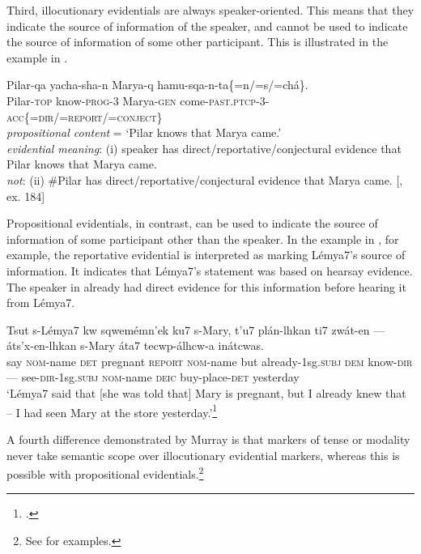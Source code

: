 Third, illocutionary evidentials are always speaker-oriented. This means that they indicate the source of information of the speaker, and cannot be used to indicate the source of information of some other participant. This is illustrated in the  example in .


\ea \label{ex:17.13}
\gll Pilar-qa  yacha-sha-n  Marya-q  hamu-sqa-n-ta\{=n/=s/=chá\}.\\
Pilar-\textsc{top}  know-\textsc{prog}-3  Marya-\textsc{gen}  come-\textsc{past.ptcp}-3-\textsc{acc\{=dir}/=\textsc{report}/=\textsc{conject\}}\\
\glt \textit{propositional content} = ‘Pilar knows that Marya came.’\\
\textit{evidential meaning}: (i) speaker has direct/reportative/conjectural evidence that Pilar knows that Marya came.\\
\textit{not}: (ii) \#Pilar has direct/reportative/conjectural evidence that Marya came. 
     {}[\citealt{Faller2002}, ex. 184]
\z


Propositional evidentials, in contrast, can be used to indicate the source of information of some participant other than the speaker. In the  example in , for example, the reportative evidential is interpreted as marking Lémya7’s source of information. It indicates that Lémya7’s statement was based on hearsay evidence. The speaker in  already had direct evidence for this information before hearing it from Lémya7.

\ea  \label{ex:17.14}
\gll Tsut  s-Lémya7  kw  sqwemémn’ek  ku7  s-Mary,  t’u7  plán-lhkan ti7  zwát-en  ---  áts’x-en-lhkan  s-Mary  áta7  tecwp-álhcw-a  inátcwas.\\
say  \textsc{nom}-name  \textsc{det}  pregnant  \textsc{report}  \textsc{nom}-name  but  already-1sg.\textsc{subj} \textsc{dem}  know-\textsc{dir}  ---  see-\textsc{dir}-1sg.\textsc{subj}  \textsc{nom}-name  \textsc{deic}  buy-place-\textsc{det}  yesterday\\
\glt ‘Lémya7 said that [she was told that] Mary is pregnant, but I already knew that – I had seen Mary at the store yesterday.’\footnote{\citet{MatthewsonEtAl2007}.}
\z

A fourth difference demonstrated by Murray is that markers of tense or modality never take semantic scope over illocutionary evidential markers, whereas this is possible with propositional evidentials.\footnote{See \citet[§3.4.2]{Murray2010} for examples.}



